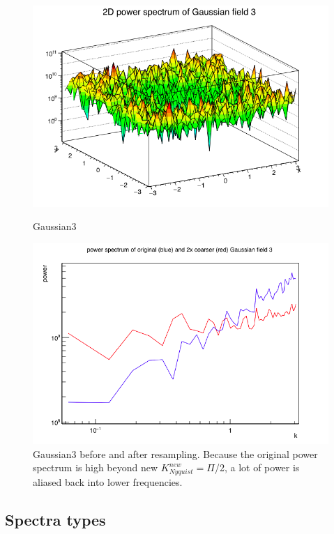 \begin{figure}[!htbp]
\centering
\begin{minipage}{.5\textwidth}
  \centering
  \includegraphics[width=1\linewidth]{gau3color}
  \caption{Gaussian3}
  \label{3col}
\end{minipage}%
\begin{minipage}{.5\textwidth}
  \centering
  \includegraphics[width=1.1\linewidth]{2BC3}
  \caption{Gaussian3 before and after resampling. Because the original power spectrum is high beyond new $K^{new}_{Nyquist} =\Pi$/2, a lot of power is aliased back into lower frequencies.} 
  \label{2BC3}
\end{minipage}
\end{figure}
\FloatBarrier

 
\subsection{Spectra types}
